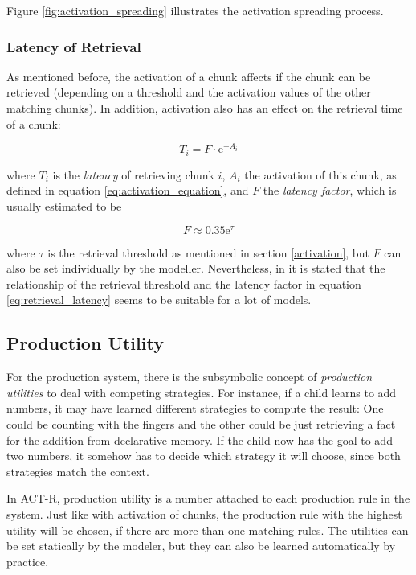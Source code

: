 Figure \ref{fig:activation_spreading} illustrates the activation spreading process.

\subsubsection{Latency of Retrieval}

As mentioned before, the activation of a chunk affects if the chunk can be retrieved (depending on a threshold and the activation values of the other matching chunks). In addition, activation also has an effect on the retrieval time of a chunk:

\begin{equation}
\label{eq:retrieval_latency}
T_i = F \cdot \mathrm{e}^{-A_i}
\end{equation}

where $T_i$ is the \emph{latency} of retrieving chunk $i$, $A_i$ the activation of this chunk, as defined in equation \eqref{eq:activation_equation}, and $F$ the \emph{latency factor}, which is usually estimated to be

\begin{equation}
F \approx 0.35\mathrm{e}^\tau
\end{equation}

where $\tau$ is the retrieval threshold as mentioned in section \ref{activation}, but $F$ can also be set individually by the modeller. Nevertheless, in \cite[1042]{anderson_integrated_2004} it is stated that the relationship of the retrieval threshold and the latency factor in equation \eqref{eq:retrieval_latency} seems to be suitable for a lot of models.

\subsection{Production Utility}

For the production system, there is the subsymbolic concept of \emph{production utilities} to deal with competing strategies. For instance, if a child learns to add numbers, it may have learned different strategies to compute the result: One could be counting with the fingers and the other could be just retrieving a fact for the addition from declarative memory. If the child now has the goal to add two numbers, it somehow has to decide which strategy it will choose, since both strategies match the context.

In ACT-R, production utility is a number attached to each production rule in the system. Just like with activation of chunks, the production rule with the highest utility will be chosen, if there are more than one matching rules. The utilities can be set statically by the modeler, but they can also be learned automatically by practice.

